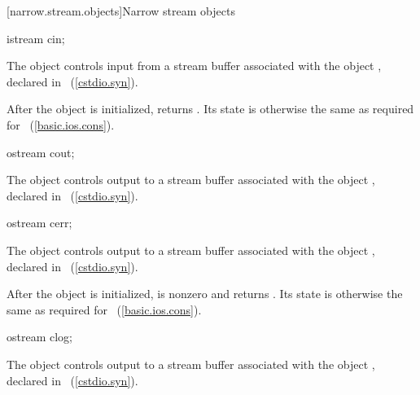 [narrow.stream.objects]{Narrow stream objects}

%
\begin{itemdecl}
istream cin;
\end{itemdecl}

\begin{itemdescr}
\pnum
The object
controls input from a stream buffer
associated with the object
,
declared in
%
~(\ref{cstdio.syn}).

\pnum
After the object
is initialized,
returns
.
Its state is otherwise the same as required for
~(\ref{basic.ios.cons}).
\end{itemdescr}

%
\begin{itemdecl}
ostream cout;
\end{itemdecl}

\begin{itemdescr}
\pnum
The object
controls output to a stream buffer
associated with the object
,
declared in
%
~(\ref{cstdio.syn}).
\end{itemdescr}

%
\begin{itemdecl}
ostream cerr;
\end{itemdecl}

\begin{itemdescr}
\pnum
The object
controls output to a stream buffer
associated with the object
,
declared in
%
~(\ref{cstdio.syn}).

\pnum
After the object
is initialized,
is nonzero and  returns .
Its state is otherwise the same as required for
~(\ref{basic.ios.cons}).
\end{itemdescr}

%
\begin{itemdecl}
ostream clog;
\end{itemdecl}

\begin{itemdescr}
\pnum
The object
controls output to a stream buffer
associated with the object
,
declared in
%
~(\ref{cstdio.syn}).
\end{itemdescr}

